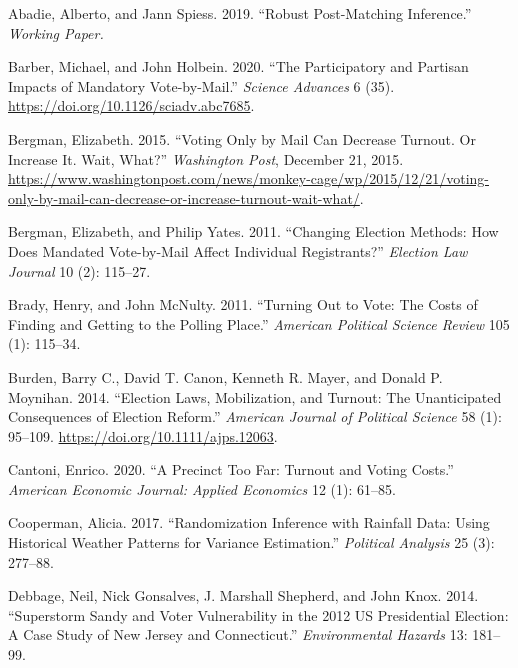 \documentclass[
  12pt,
]{article}
\newlength{\cslhangindent}
\newenvironment{cslreferences}%
  {\setlength{\parindent}{0pt}%
  \everypar{\setlength{\hangindent}{\cslhangindent}}\ignorespaces}%
  {\par}
\begin{document}
\hypertarget{refs}{}
\begin{cslreferences}
\leavevmode\hypertarget{ref-Abadie2019}{}%
Abadie, Alberto, and Jann Spiess. 2019. ``Robust Post-Matching Inference.'' \emph{Working Paper.}

\leavevmode\hypertarget{ref-Barber2020}{}%
Barber, Michael, and John Holbein. 2020. ``The Participatory and Partisan Impacts of Mandatory Vote-by-Mail.'' \emph{Science Advances} 6 (35). \url{https://doi.org/10.1126/sciadv.abc7685}.

\leavevmode\hypertarget{ref-Bergman2015}{}%
Bergman, Elizabeth. 2015. ``Voting Only by Mail Can Decrease Turnout. Or Increase It. Wait, What?'' \emph{Washington Post}, December 21, 2015. \url{https://www.washingtonpost.com/news/monkey-cage/wp/2015/12/21/voting-only-by-mail-can-decrease-or-increase-turnout-wait-what/}.

\leavevmode\hypertarget{ref-Bergman2011}{}%
Bergman, Elizabeth, and Philip Yates. 2011. ``Changing Election Methods: How Does Mandated Vote-by-Mail Affect Individual Registrants?'' \emph{Election Law Journal} 10 (2): 115--27.

\leavevmode\hypertarget{ref-Brady2011}{}%
Brady, Henry, and John McNulty. 2011. ``Turning Out to Vote: The Costs of Finding and Getting to the Polling Place.'' \emph{American Political Science Review} 105 (1): 115--34.

\leavevmode\hypertarget{ref-Burden2014}{}%
Burden, Barry C., David T. Canon, Kenneth R. Mayer, and Donald P. Moynihan. 2014. ``Election Laws, Mobilization, and Turnout: The Unanticipated Consequences of Election Reform.'' \emph{American Journal of Political Science} 58 (1): 95--109. \url{https://doi.org/10.1111/ajps.12063}.

\leavevmode\hypertarget{ref-Cantoni2020}{}%
Cantoni, Enrico. 2020. ``A Precinct Too Far: Turnout and Voting Costs.'' \emph{American Economic Journal: Applied Economics} 12 (1): 61--85.

\leavevmode\hypertarget{ref-Cooperman2017}{}%
Cooperman, Alicia. 2017. ``Randomization Inference with Rainfall Data: Using Historical Weather Patterns for Variance Estimation.'' \emph{Political Analysis} 25 (3): 277--88.

\leavevmode\hypertarget{ref-Debbage2014}{}%
Debbage, Neil, Nick Gonsalves, J. Marshall Shepherd, and John Knox. 2014. ``Superstorm Sandy and Voter Vulnerability in the 2012 US Presidential Election: A Case Study of New Jersey and Connecticut.'' \emph{Environmental Hazards} 13: 181--99.


\end{cslreferences}
\end{document}
